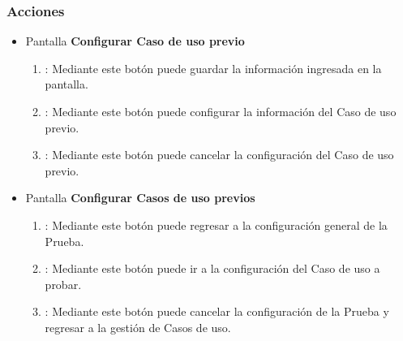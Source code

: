 \subsubsection{Acciones}
\begin{itemize}
 \item Pantalla \textbf{Configurar Caso de uso previo}
  \begin{enumerate}
	\item {}: Mediante este botón puede guardar la información ingresada en la pantalla.
	\item {}: Mediante este botón puede configurar la información del Caso de uso previo.
	\item {}: Mediante este botón puede cancelar la configuración del Caso de uso previo.
  \end{enumerate}
  \item Pantalla \textbf{Configurar Casos de uso previos}
  \begin{enumerate}
	\item {}: Mediante este botón puede regresar a la configuración general de la Prueba.
	\item {}: Mediante este botón puede ir a la configuración del Caso de uso a probar.
	\item {}: Mediante este botón puede cancelar la configuración de la Prueba y regresar a la gestión de Casos de uso.
  \end{enumerate}
\end{itemize}
	
	
